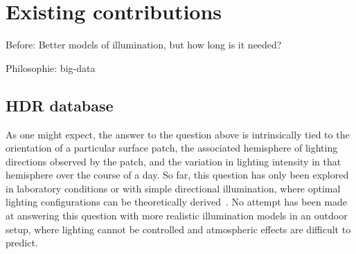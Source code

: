 \documentclass{report}
\begin{document}


\chapter{Existing contributions}
\label{}

Before: Better models of illumination, but how long is it needed?

Philosophie: big-data

\section{HDR database}


As one might expect, the answer to the question above is intrinsically tied to the orientation of a particular surface patch, the associated hemisphere of lighting directions observed by the patch, and the variation in lighting intensity in that hemisphere over the course of a day. So far, this question has only been explored in laboratory conditions or with simple directional illumination, where optimal lighting configurations can be theoretically derived~\cite{drbohlav-iccv-05,klaudiny-prl-14,shen-pg-14}. No attempt has been made at answering this question with more realistic illumination models in an outdoor setup, where lighting cannot be controlled and atmospheric effects are difficult to predict.
\end{document}
